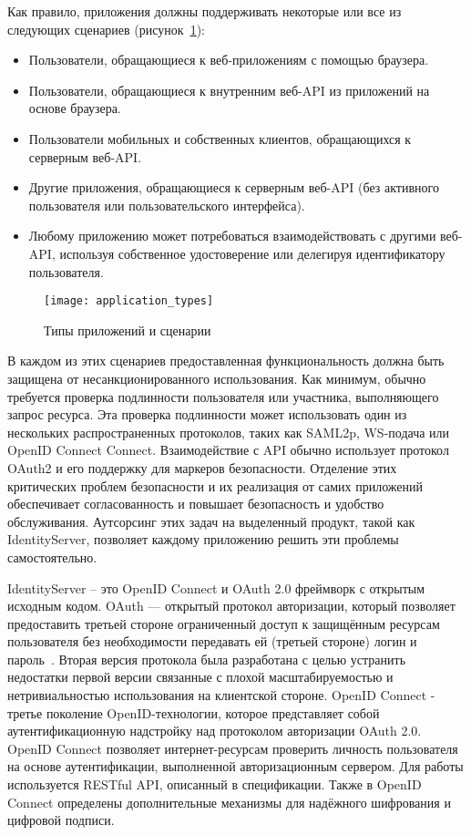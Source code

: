 Как правило, приложения должны поддерживать некоторые или все из следующих сценариев (рисунок~\ref{fig:application_types}):

\begin{itemize}
    \item Пользователи, обращающиеся к веб-приложениям с помощью браузера.
    \item Пользователи, обращающиеся к внутренним веб-API из приложений на основе браузера.
    \item Пользователи мобильных и собственных клиентов, обращающихся к серверным веб-API.
    \item Другие приложения, обращающиеся к серверным веб-API (без активного пользователя или пользовательского интерфейса).
    \item Любому приложению может потребоваться взаимодействовать с другими веб-API, используя собственное удостоверение или делегируя идентификатору пользователя.
\end{itemize}

\begin{figure}[ht]
    \centering
    \texttt{[image: application\_types]}
    \caption{Типы приложений и сценарии}\label{fig:application_types}
\end{figure}

В каждом из этих сценариев предоставленная функциональность должна быть защищена от несанкционированного использования. Как минимум, обычно требуется проверка подлинности пользователя или участника, выполняющего запрос ресурса. Эта проверка подлинности может использовать один из нескольких распространенных протоколов, таких как SAML2p, WS-подача или OpenID Connect Connect. Взаимодействие с API обычно использует протокол OAuth2 и его поддержку для маркеров безопасности. Отделение этих критических проблем безопасности и их реализация от самих приложений обеспечивает согласованность и повышает безопасность и удобство обслуживания. Аутсорсинг этих задач на выделенный продукт, такой как IdentityServer, позволяет каждому приложению решить эти проблемы самостоятельно.

IdentityServer – это OpenID Connect и OAuth 2.0 фреймворк с открытым исходным кодом. OAuth — открытый протокол авторизации, который позволяет предоставить третьей стороне ограниченный доступ к защищённым ресурсам пользователя без необходимости передавать ей (третьей стороне) логин и пароль~\cite{wiki_oauth}. Вторая версия протокола была разработана с целью устранить недостатки первой версии связанные с плохой масштабируемостью и нетривиальностью использования на клиентской стороне. OpenID Connect - третье поколение OpenID-технологии, которое представляет собой аутентификационную надстройку над протоколом авторизации OAuth 2.0. OpenID Connect позволяет интернет-ресурсам проверить личность пользователя на основе аутентификации, выполненной авторизационным сервером. Для работы используется RESTful API, описанный в спецификации. Также в OpenID Connect определены дополнительные механизмы для надёжного шифрования и цифровой подписи.

